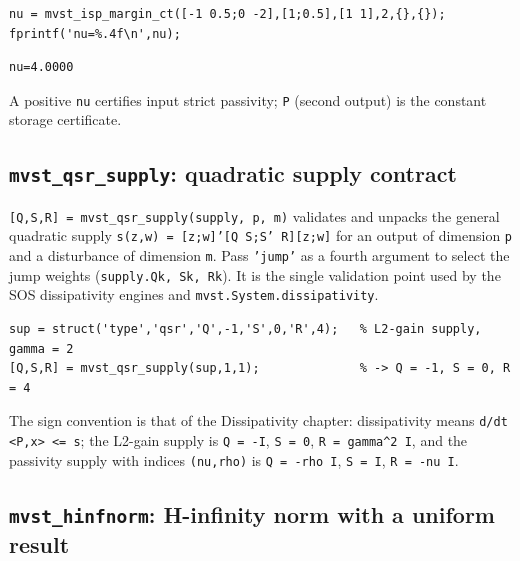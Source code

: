 \documentclass[11pt,oneside]{report}
\newcommand{\code}[1]{\texttt{#1}}
\begin{document}
\begin{lstlisting}[style=matlabstyle]
nu = mvst_isp_margin_ct([-1 0.5;0 -2],[1;0.5],[1 1],2,{},{});
fprintf('nu=%.4f\n',nu);
\end{lstlisting}

\begin{lstlisting}[style=outputstyle]
nu=4.0000
\end{lstlisting}

A positive \code{nu} certifies input strict passivity; \code{P} (second output) is the
constant storage certificate.

\hypertarget{mvst_qsr_supply-quadratic-supply-contract}{%
\subsection{\texorpdfstring{\code{mvst\_qsr\_supply}: quadratic supply contract}{mvst\_qsr\_supply: quadratic supply contract}}\label{mvst_qsr_supply-quadratic-supply-contract}}

\code{[Q,S,R] = mvst\_qsr\_supply(supply, p, m)} validates and unpacks the general
quadratic supply \code{s(z,w) = [z;w]'[Q S;S' R][z;w]} for an output of dimension \code{p}
and a disturbance of dimension \code{m}. Pass \code{'jump'} as a fourth argument to select
the jump weights (\code{supply.Qk, Sk, Rk}). It is the single validation point used
by the SOS dissipativity engines and \code{mvst.System.dissipativity}.

\begin{lstlisting}[style=matlabstyle]
sup = struct('type','qsr','Q',-1,'S',0,'R',4);   % L2-gain supply, gamma = 2
[Q,S,R] = mvst_qsr_supply(sup,1,1);              % -> Q = -1, S = 0, R = 4
\end{lstlisting}

The sign convention is that of the Dissipativity chapter: dissipativity means
\code{d/dt \textless{}P,x\textgreater{} \textless{}= s}; the L2-gain supply is \code{Q = -I}, \code{S = 0}, \code{R = gamma\^{}2 I}, and
the passivity supply with indices \code{(nu,rho)} is \code{Q = -rho I}, \code{S = I},
\code{R = -nu I}.

\hypertarget{mvst_hinfnorm-h-infinity-norm-with-a-uniform-result}{%
\subsection{\texorpdfstring{\code{mvst\_hinfnorm}: H-infinity norm with a uniform result}{mvst\_hinfnorm: H-infinity norm with a uniform result}}\label{mvst_hinfnorm-h-infinity-norm-with-a-uniform-result}}
\end{document}
